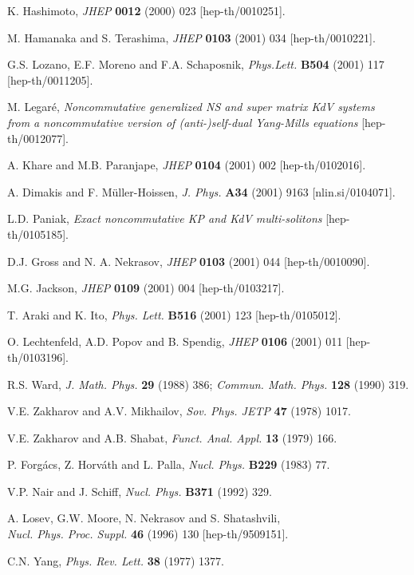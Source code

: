 \documentclass[a4paper,11pt]{article}
\numberwithin{equation}{section}
\begin{document}
\begin{thebibliography}{99}
K. Hashimoto,
{\sl JHEP} {\bf 0012} (2000) 023 [hep-th/0010251].

M. Hamanaka and S. Terashima,
{\sl JHEP} {\bf 0103} (2001) 034 [hep-th/0010221].

G.S. Lozano, E.F. Moreno and F.A. Schaposnik,
{\sl Phys.Lett.} {\bf B504} (2001) 117 [hep-th/0011205].

M. Legar\'e,
{\it Noncommutative generalized NS and super matrix KdV systems \\
from a noncommutative version of (anti-)self-dual Yang-Mills equations}
[hep-th/0012077].

A. Khare and M.B. Paranjape,
{\sl JHEP} {\bf 0104} (2001) 002 [hep-th/0102016].

A. Dimakis and F. M\"uller-Hoissen,
{\sl J. Phys.} {\bf A34} (2001) 9163 
[nlin.si/0104071].

L.D. Paniak,
{\it Exact noncommutative KP and KdV multi-solitons}
[hep-th/0105185].

D.J. Gross and N. A. Nekrasov,
{\sl JHEP} {\bf 0103} (2001) 044 [hep-th/0010090].

M.G. Jackson,
{\sl JHEP} {\bf 0109} (2001) 004 
[hep-th/0103217].

T. Araki and K. Ito,
{\sl Phys. Lett.} {\bf B516} (2001) 123 
[hep-th/0105012].

O. Lechtenfeld, A.D. Popov and B. Spendig,
{\sl JHEP} {\bf 0106} (2001) 011 [hep-th/0103196].

R.S. Ward,
{\sl J. Math. Phys.} {\bf 29} (1988) 386;
{\sl Commun. Math. Phys.} {\bf 128} (1990) 319.

V.E. Zakharov and A.V. Mikhailov,
{\sl Sov. Phys. JETP} {\bf 47} (1978) 1017.

V.E. Zakharov and A.B. Shabat,
{\sl Funct. Anal. Appl.} {\bf 13} (1979) 166.

P. Forg\'acs, Z. Horv\'ath and L. Palla,
{\sl Nucl. Phys.} {\bf B229} (1983) 77.

V.P. Nair and J. Schiff,
{\sl Nucl. Phys.} {\bf B371} (1992) 329.

A. Losev, G.W. Moore, N. Nekrasov and S. Shatashvili,\\
{\sl Nucl. Phys. Proc. Suppl.} {\bf 46} (1996) 130 [hep-th/9509151].

C.N. Yang,
{\sl Phys. Rev. Lett.} {\bf 38} (1977) 1377.


\end{thebibliography}
\end{document}
